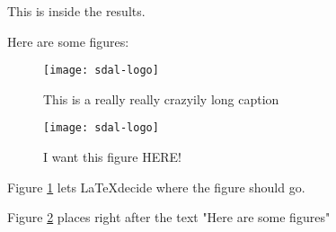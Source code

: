 \documentclass[../../master.tex]{subfiles}
\begin{document}
This is inside the results.

Here are some figures:

\begin{figure}
\centering
\texttt{[image: sdal-logo]}
\caption[Short caption]{This is a really really crazyily long caption}
\label{fig:sdal-logo1}
\end{figure}

\begin{figure}[h!]
\centering
\texttt{[image: sdal-logo]}
\caption[HERE!]{I want this figure HERE!}
\label{fig:sdal-logo2}
\end{figure}

Figure \ref{fig:sdal-logo1} lets \LaTeX decide where the figure should go.

Figure \ref{fig:sdal-logo2} places right after the text "Here are some figures"
\end{document}
